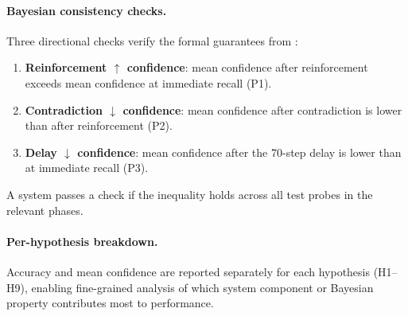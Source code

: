\paragraph{Bayesian consistency checks.}
Three directional checks verify the formal guarantees from :
\begin{enumerate}[nosep,leftmargin=1.5em]
  \item \textbf{Reinforcement $\uparrow$ confidence}: mean confidence after reinforcement exceeds mean confidence at immediate recall (P1).
  \item \textbf{Contradiction $\downarrow$ confidence}: mean confidence after contradiction is lower than after reinforcement (P2).
  \item \textbf{Delay $\downarrow$ confidence}: mean confidence after the 70-step delay is lower than at immediate recall (P3).
\end{enumerate}
A system passes a check if the inequality holds across all test probes in the relevant phases.

\paragraph{Per-hypothesis breakdown.}
Accuracy and mean confidence are reported separately for each hypothesis (H1--H9), enabling fine-grained analysis of which system component or Bayesian property contributes most to performance.
